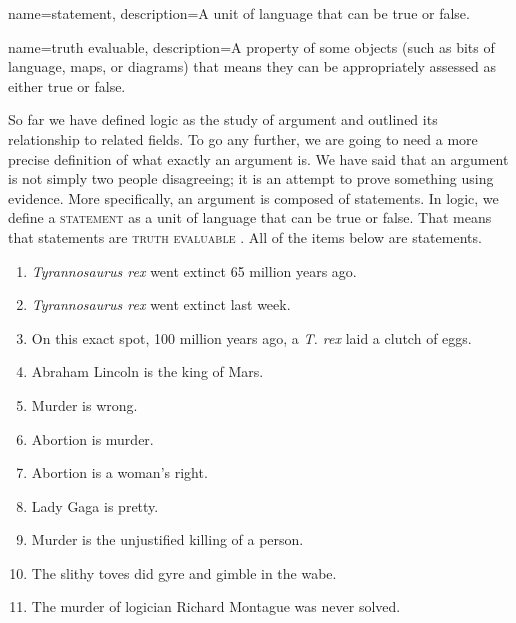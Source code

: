 {
name=statement,
description={A unit of language that can be true or false.}
}

{
name=truth evaluable,
description={A property of some objects (such as bits of language, maps, or diagrams) that means they can be appropriately assessed as either true or false.}
}

So far we have defined logic as the study of argument and outlined its relationship to related fields. To go any further, we are going to need a more precise definition of what exactly an argument is. We have said that an argument is not simply two people disagreeing; it is an attempt to prove something using evidence. More specifically, an argument is composed of statements. In logic, we define a \textsc{\gls{statement}} \label{def:statement} as a unit of language that can be true or false. That means that statements are \textsc{\gls{truth evaluable}} \label{def:truth_evaluable}. All of the items below are statements.

\begin{enumerate}
	\item \label{itm:trex-true} \emph{Tyrannosaurus rex} went extinct 65 million years ago.
	\item \label{itm:trex-false} \emph{Tyrannosaurus rex} went extinct last week.
	\item \label{itm:trex-unknown} On this exact spot, 100  million years ago, a \emph{T. rex} laid a clutch of eggs.
	\item \label{itm:silly} Abraham Lincoln is the king of Mars.
	\item \label{itm:moral}Murder is wrong.
	\item \label{itm:opinion1}Abortion is murder.
	\item \label{itm:opinion2}Abortion is a woman's right.
	\item \label{itm:opinion3}Lady Gaga is pretty.
	\item \label{itm:definition}Murder is the unjustified killing of a person.
	\item \label{itm:nonsense}The slithy toves did gyre and gimble in the wabe.
	\item \label{itm:history}The murder of logician Richard Montague was never solved.
\end{enumerate}

